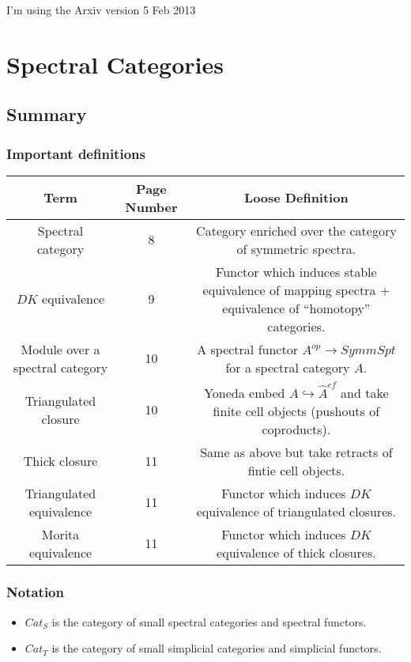\documentclass[letterpaper]{article}
\theoremstyle{definition}
\begin{document}
I'm using the Arxiv version 5 Feb 2013

\tableofcontents

\section{Spectral Categories}

\subsection{Summary}
\subsubsection{Important definitions}
\begin{tabulary}{0.7 \textwidth}{|C|C|C|}
\hline
Term & Page Number & Loose Definition\\
\hline
\hline
Spectral category & 8& Category enriched over the category of
                       symmetric spectra.\\
\hline
$DK$ equivalence &9& Functor which induces stable equivalence of mapping spectra +
                       equivalence of ``homotopy'' categories.\\
\hline
Module over a spectral category &10& A spectral functor $A^{op}
                                     \rightarrow SymmSpt$ for a spectral
                                     category $A$.\\
\hline
Triangulated closure &10 & Yoneda embed $A \hookrightarrow \widehat
                           A^{cf}$ and take finite cell objects
                           (pushouts of coproducts).\\
\hline
Thick closure &11 & Same as above but take retracts of fintie cell objects.\\
\hline
Triangulated equivalence  & 11& Functor which induces $DK$ equivalence of
                                triangulated closures.\\
\hline
Morita equivalence & 11& Functor which induces $DK$ equivalence of thick closures.\\
\hline
\end{tabulary}

\subsubsection{Notation}
\begin{itemize}
\item $Cat_S$ is the category of small spectral categories and
  spectral functors. 
\item $Cat_T$ is the category of small simplicial categories and
  simplicial functors. 
\end{itemize}
\end{document}
